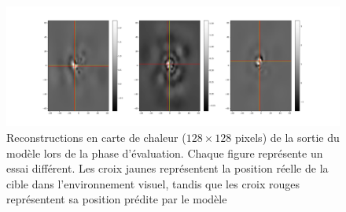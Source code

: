 \begin{figure}[th]
\centering
\includegraphics[scale=0.325]{Figures/prediction}
\decoRule
\caption[Figure]{Reconstructions en carte de chaleur ($128\times 128$ pixels) de la sortie du modèle lors de la phase d'évaluation. Chaque figure représente un essai différent. Les croix jaunes représentent la position réelle de la cible dans l'environnement visuel, tandis que les croix rouges représentent sa position prédite par le modèle}
\label{fig:prediction}
\end{figure}
